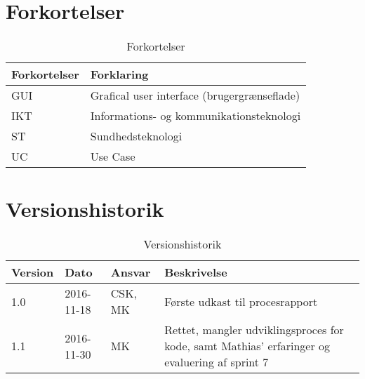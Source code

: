 \chapter{Forkortelser}

\begin{table}[h]
\centering
\begin{tabular}{|l| p{}|}
\hline
\textbf{Forkortelser} &  \textbf{Forklaring} \\\hline
GUI & Grafical user interface (brugergrænseflade) \\\hline
IKT & Informations- og kommunikationsteknologi \\\hline
ST  & Sundhedsteknologi \\\hline
UC  & Use Case \\\hline
\end{tabular}
\caption{Forkortelser}
\end{table}

\vspace{5cm}

{\let\clearpage\relax\chapter{Versionshistorik}}
\begin{table}[h]
\centering
\begin{tabular}{|l|l|l| p{}|}
\hline
\textbf{Version} &  \textbf{Dato} &  \textbf{Ansvar} & \textbf{Beskrivelse}\\\hline
1.0 & 2016-11-18 & CSK, MK & Første udkast til procesrapport \\\hline
1.1 & 2016-11-30 & MK & Rettet, mangler udviklingsproces for kode, samt Mathias' erfaringer og evaluering af sprint 7 \\\hline
\end{tabular}
\caption{Versionshistorik}
\end{table}